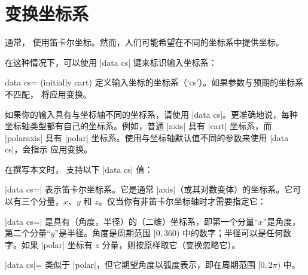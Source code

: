 
\section{变换坐标系}

通常，\PGFPlots{} 使用笛卡尔坐标。然而，人们可能希望在不同的坐标系中提供坐标。

在这种情况下，可以使用 |data cs| 键来标识输入坐标系：

\begin{pgfplotskey}{data cs= (initially cart)}
    \label{key:data:cs}
    定义输入坐标的坐标系（`cs'）。如果参数与预期的坐标系不匹配，\PGFPlots{} 将应用变换。

    如果你的输入具有与坐标轴不同的坐标系，请使用 |data cs|。更准确地说，每种坐标轴类型都有自己的坐标系。例如，普通 |axis| 具有 |cart| 坐标系，而 |polaraxis| 具有 |polar| 坐标系。使用与坐标轴默认值不同的参数来使用 |data cs|，会指示 \PGFPlots{} 应用变换。

    在撰写本文时，\PGFPlots{} 支持以下 |data cs| 值：

    |data cs=| 表示笛卡尔坐标系。它是通常 |axis|（或其对数变体）的坐标系。它可以有三个分量，$x$、$y$ 和 $z$。仅当你有非笛卡尔坐标轴时才需要指定它：
\begin{codeexample}[]
\end{codeexample}

    |data cs=| 是具有（角度，半径）的（二维）坐标系，即第一个分量“$x$”是角度，第二个分量“$y$”是半径。角度是周期范围 $[0,360)$ 中的数字；半径可以是任何数字。如果 |polar| 坐标有 $z$ 分量，则按原样取它（变换忽略它）。
\begin{codeexample}[]
\end{codeexample}

    |data cs|= 类似于 |polar|，但它期望角度以弧度表示，即在周期范围 $[0,2\pi)$ 中。
\begin{codeexample}[]
\end{codeexample}


\end{pgfplotskey}
